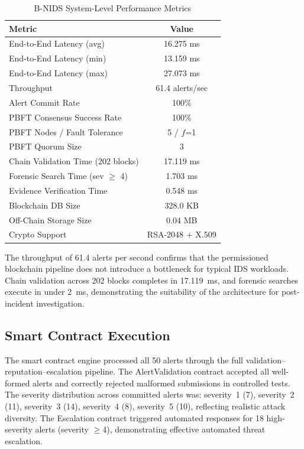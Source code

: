 \documentclass[conference]{IEEEtran}
\begin{document}
\begin{table}[t]
\centering
\caption{B-NIDS System-Level Performance Metrics}
\label{tab:system_metrics}
\setlength{\tabcolsep}{4pt}
\begin{tabular}{|l|c|}
\hline
\textbf{Metric} & \textbf{Value} \\
\hline
End-to-End Latency (avg) & 16.275 ms \\
End-to-End Latency (min) & 13.159 ms \\
End-to-End Latency (max) & 27.073 ms \\
Throughput & 61.4 alerts/sec \\
Alert Commit Rate & 100\% \\
\hline
PBFT Consensus Success Rate & 100\% \\
PBFT Nodes / Fault Tolerance & 5 / $f$=1 \\
PBFT Quorum Size & 3 \\
\hline
Chain Validation Time (202 blocks) & 17.119 ms \\
Forensic Search Time (sev $\geq$ 4) & 1.703 ms \\
Evidence Verification Time & 0.548 ms \\
\hline
Blockchain DB Size & 328.0 KB \\
Off-Chain Storage Size & 0.04 MB \\
Crypto Support & RSA-2048 + X.509 \\
\hline
\end{tabular}
\end{table}

The throughput of 61.4 alerts per second confirms that the permissioned blockchain pipeline does not introduce a bottleneck for typical IDS workloads. Chain validation across 202 blocks completes in 17.119~ms, and forensic searches execute in under 2~ms, demonstrating the suitability of the architecture for post-incident investigation.

\subsection{Smart Contract Execution}
The smart contract engine processed all 50 alerts through the full validation--reputation--escalation pipeline. The AlertValidation contract accepted all well-formed alerts and correctly rejected malformed submissions in controlled tests. The severity distribution across committed alerts was: severity~1 (7), severity~2 (11), severity~3 (14), severity~4 (8), severity~5 (10), reflecting realistic attack diversity. The Escalation contract triggered automated responses for 18 high-severity alerts (severity $\geq 4$), demonstrating effective automated threat escalation.
\end{document}
